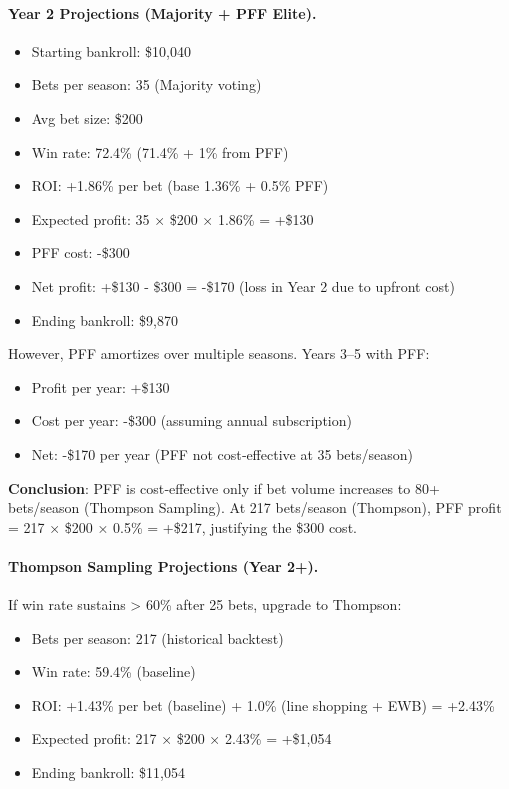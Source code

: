 \paragraph{Year 2 Projections (Majority + PFF Elite).}
\begin{itemize}
\item Starting bankroll: \$10,040
\item Bets per season: 35 (Majority voting)
\item Avg bet size: \$200
\item Win rate: 72.4\% (71.4\% + 1\% from PFF)
\item ROI: +1.86\% per bet (base 1.36\% + 0.5\% PFF)
\item Expected profit: 35 × \$200 × 1.86\% = +\$130
\item PFF cost: -\$300
\item Net profit: +\$130 - \$300 = -\$170 (loss in Year 2 due to upfront cost)
\item Ending bankroll: \$9,870
\end{itemize}

However, PFF amortizes over multiple seasons. Years 3--5 with PFF:
\begin{itemize}
\item Profit per year: +\$130
\item Cost per year: -\$300 (assuming annual subscription)
\item Net: -\$170 per year (PFF not cost‑effective at 35 bets/season)
\end{itemize}

\textbf{Conclusion}: PFF is cost‑effective only if bet volume increases to 80+ bets/season (Thompson Sampling). At 217 bets/season (Thompson), PFF profit = 217 × \$200 × 0.5\% = +\$217, justifying the \$300 cost.

\paragraph{Thompson Sampling Projections (Year 2+).}
If win rate sustains > 60\% after 25 bets, upgrade to Thompson:
\begin{itemize}
\item Bets per season: 217 (historical backtest)
\item Win rate: 59.4\% (baseline)
\item ROI: +1.43\% per bet (baseline) + 1.0\% (line shopping + EWB) = +2.43\%
\item Expected profit: 217 × \$200 × 2.43\% = +\$1,054
\item Ending bankroll: \$11,054
\end{itemize}

